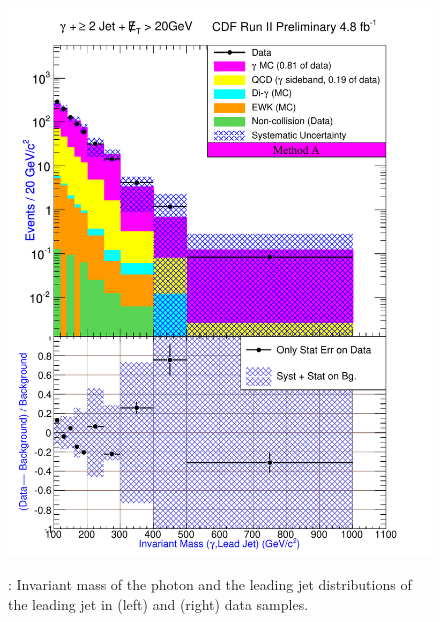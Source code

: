 \documentclass[11pt]{article}
\begin{document}
\begin{figure}[h!]
{ \includegraphics[scale=\resultsHistScale,keepaspectratio=true]{./g30jetmet20_MtdA_plot2_InvMass_pj1.pdf}
}
 \caption{: Invariant mass of the photon and the leading jet distributions of the leading jet in \phoonejetmettwenty (left) and \photwojetmettwenty (right) data samples.}
 \label{fig:Result_MtdA_gj1Met20_Mass_gj1}
\end{figure}
\end{document}
